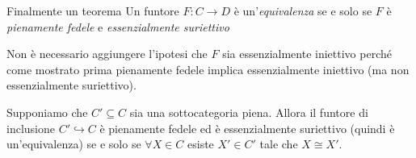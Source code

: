 \begin{theorem}{Finalmente un teorema}
    Un funtore \(F : C \to D\) è un'\emph{equivalenza} se e solo se \(F\) è \emph{pienamente fedele} e \emph{essenzialmente suriettivo}
\end{theorem}
\begin{remark}{}
    Non è necessario aggiungere l'ipotesi che \(F\) sia essenzialmente iniettivo
    perché come mostrato prima pienamente fedele implica essenzialmente
    iniettivo (ma non essenzialmente suriettivo).
\end{remark}
\begin{example}{}
    Supponiamo che \(C' \subseteq C \) sia una sottocategoria piena. Allora il
    funtore di inclusione \(C' \hookrightarrow C\) è pienamente fedele ed è
    essenzialmente suriettivo (quindi è un'equivalenza) se e solo se \(\forall X \in C\) esiste \(X' \in C'\) tale che \(X \cong X'\).
\end{example}

